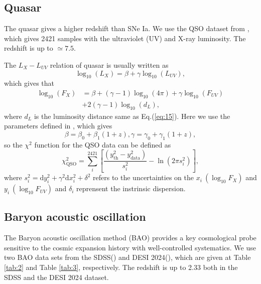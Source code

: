 \documentclass[twocolumn]{aastex631}
\begin{document}
\subsection{Quasar}

   The quasar gives a higher redshift than SNe Ia.
   We use the QSO dataset from \cite{Lusso_2020}, which gives
   2421 samples with the ultraviolet (UV) and X-ray luminosity.
   The redshift is up to $\simeq7.5$.

   The $L_X-L_{UV}$ relation of quasar is usually written as
   \begin{equation}
      \log_{10}(L_X)=\beta+\gamma\log_{10}(L_{UV}),
   \end{equation}
   which gives that
   \begin{eqnarray}
      \nonumber\log_{10}(F_X)&=\beta+(\gamma-1)\log_{10}(4\pi)+\gamma\log_{10}(F_{UV})
                    \\ &+2(\gamma-1)\log_{10}(d_L),
   \end{eqnarray}
   where $d_L$ is the luminosity distance same as Eq.(\ref{eq:15}).
   Here we use the parameters defined in \cite{li2024redshiftevolutionxrayuv}, which
   gives\begin{equation}
      \beta=\beta_0+\beta_1(1+z),\gamma=\gamma_0+\gamma_1(1+z),
   \end{equation}
   so the $\chi^2$ function for the QSO data can be defined as
   \begin{equation}
      \chi_{\text{QSO}}^2=\sum_i^{2421}\left[\frac{(y_{\text{th}}^2-y_{\text{data}}^2)}{s_i^2}
      -\ln(2\pi s_i^2)\right],
   \end{equation}
   where $s_i^2=\mathrm{d}y_i^2+\gamma^2\mathrm{d}x_i^2+\delta^2$ refers to the 
   uncertainties on the $x_i\ (\log_{10}F_X)$ and $y_i\ (\log_{10}F_{UV})$ and
   $\delta_i$ reprensent the instrinsic dispersion.

\subsection{Baryon acoustic oscillation}

   The Baryon acoustic oscillation method (BAO) provides a key cosmological probe
   sensitive to the cosmic expansion history with well-controlled systematics.
   We use two BAO data sets from the SDSS(\cite{PhysRevD.103.083533}) and DESI 2024(\cite{desicollaboration2024desi2024vicosmological}),
   which are given at Table \ref{tab:2} and Table \ref{tab:3}, respectively.
   The redshift is up to 2.33 both in the SDSS and the DESI 2024 dataset.
\end{document}
